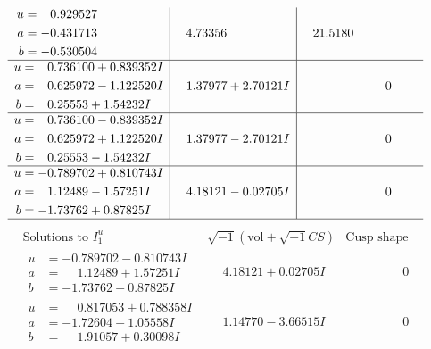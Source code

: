 \documentclass[1p]{elsarticle_modified}
\theoremstyle{definition}
\newcommand{\I}{\sqrt{-1}}
\begin{document}
$$\begin{array}{c|c|c}
\begin{aligned}
u &= \phantom{-}0.929527\phantom{ +0.000000I} \\
a &= -0.431713\phantom{ +0.000000I} \\
b &= -0.530504\phantom{ +0.000000I}\end{aligned}
 & \phantom{-}4.73356\phantom{ +0.000000I} & \phantom{-}21.5180\phantom{ +0.000000I} \\ \hline\begin{aligned}
u &= \phantom{-}0.736100 + 0.839352 I \\
a &= \phantom{-}0.625972 - 1.122520 I \\
b &= \phantom{-}0.25553 + 1.54232 I\end{aligned}
 & \phantom{-}1.37977 + 2.70121 I & \phantom{-0.000000 } 0 \\ \hline\begin{aligned}
u &= \phantom{-}0.736100 - 0.839352 I \\
a &= \phantom{-}0.625972 + 1.122520 I \\
b &= \phantom{-}0.25553 - 1.54232 I\end{aligned}
 & \phantom{-}1.37977 - 2.70121 I & \phantom{-0.000000 } 0 \\ \hline\begin{aligned}
u &= -0.789702 + 0.810743 I \\
a &= \phantom{-}1.12489 - 1.57251 I \\
b &= -1.73762 + 0.87825 I\end{aligned}
 & \phantom{-}4.18121 - 0.02705 I & \phantom{-0.000000 } 0\\
 \hline 
 \end{array}$$\newpage$$\begin{array}{c|c|c}  
\text{Solutions to }I^u_{1}& \I (\text{vol} + \sqrt{-1}CS) & \text{Cusp shape}\\
 \hline 
\begin{aligned}
u &= -0.789702 - 0.810743 I \\
a &= \phantom{-}1.12489 + 1.57251 I \\
b &= -1.73762 - 0.87825 I\end{aligned}
 & \phantom{-}4.18121 + 0.02705 I & \phantom{-0.000000 } 0 \\ \hline\begin{aligned}
u &= \phantom{-}0.817053 + 0.788358 I \\
a &= -1.72604 - 1.05558 I \\
b &= \phantom{-}1.91057 + 0.30098 I\end{aligned}
 & \phantom{-}1.14770 - 3.66515 I & \phantom{-0.000000 } 0 \\ \hline\begin{aligned}

\end{aligned}
\end{array}$$
\end{document}
